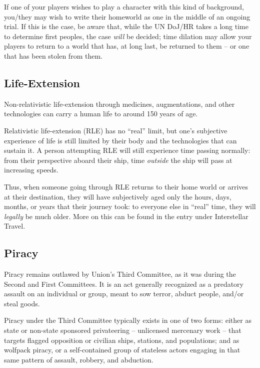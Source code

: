 If one of your players wishes to play a character with this kind of background, you/they may wish
to write their homeworld as one in the middle of an ongoing trial. If this is the case, be aware
that, while the UN DoJ/HR takes a long time to determine first peoples, the case \textit{will} be decided;
time dilation may allow your players to return to a world that has, at long last, be returned to
them -- or one that has been stolen from them.

\subsection{Life-Extension}

Non-relativistic life-extension through medicines, augmentations, and other technologies can
carry a human life to around 150 years of age.

Relativistic life-extension (RLE) has no ``real'' limit, but one’s subjective experience of life is still
limited by their body and the technologies that can sustain it. A person attempting RLE will still
experience time passing normally: from their perspective aboard their ship, time \textit{outside} the ship
will pass at increasing speeds.

Thus, when someone going through RLE returns to their home world or arrives at their
destination, they will have subjectively aged only the hours, days, months, or years that their
journey took: to everyone else in ``real'' time, they will \textit{legally} be much older. More on this can be
found in the entry under Interstellar Travel.

\subsection{Piracy}

Piracy remains outlawed by Union’s Third Committee, as it was during the Second and First
Committees. It is an act generally recognized as a predatory assault on an individual or group,
meant to sow terror, abduct people, and/or steal goods.

Piracy under the Third Committee typically exists in one of two forms: either as state or non-state
sponsored privateering -- unlicensed mercenary work -- that targets flagged opposition or
civilian ships, stations, and populations; and as wolfpack piracy, or a self-contained group of
stateless actors engaging in that same pattern of assault, robbery, and abduction.

